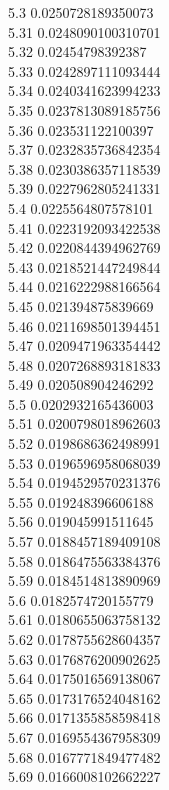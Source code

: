 {5.3	0.0250728189350073\\
5.31	0.0248090100310701\\
5.32	0.02454798392387\\
5.33	0.0242897111093444\\
5.34	0.0240341623994233\\
5.35	0.0237813089185756\\
5.36	0.023531122100397\\
5.37	0.0232835736842354\\
5.38	0.0230386357118539\\
5.39	0.0227962805241331\\
5.4	0.0225564807578101\\
5.41	0.0223192093422538\\
5.42	0.0220844394962769\\
5.43	0.0218521447249844\\
5.44	0.0216222988166564\\
5.45	0.021394875839669\\
5.46	0.0211698501394451\\
5.47	0.0209471963354442\\
5.48	0.0207268893181833\\
5.49	0.020508904246292\\
5.5	0.0202932165436003\\
5.51	0.0200798018962603\\
5.52	0.0198686362498991\\
5.53	0.0196596958068039\\
5.54	0.0194529570231376\\
5.55	0.019248396606188\\
5.56	0.019045991511645\\
5.57	0.0188457189409108\\
5.58	0.0186475563384376\\
5.59	0.0184514813890969\\
5.6	0.0182574720155779\\
5.61	0.0180655063758132\\
5.62	0.0178755628604357\\
5.63	0.0176876200902625\\
5.64	0.0175016569138067\\
5.65	0.0173176524048162\\
5.66	0.0171355858598418\\
5.67	0.0169554367958309\\
5.68	0.0167771849477482\\
5.69	0.0166008102662227\\
}
